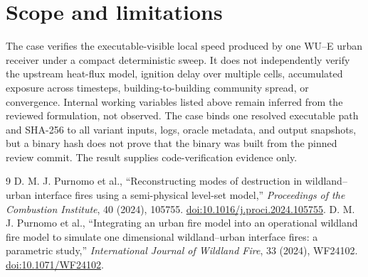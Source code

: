 \section{Scope and limitations}

The case verifies the executable-visible local speed produced by one WU--E
urban receiver under a compact deterministic sweep.  It does not independently
verify the upstream heat-flux model, ignition delay over multiple cells, accumulated exposure across
timesteps, building-to-building community spread, or convergence.  Internal
working variables listed above remain inferred from the reviewed formulation,
not observed.  The case binds one resolved executable path and SHA-256 to all
variant inputs, logs, oracle metadata, and output snapshots, but a binary hash
does not prove that the binary was built from the pinned review commit.  The
result supplies code-verification evidence only.

\begin{thebibliography}{9}
 D. M. J. Purnomo et al., ``Reconstructing modes of destruction in wildland--urban interface fires using a semi-physical level-set model,'' \emph{Proceedings of the Combustion Institute}, 40 (2024), 105755. \href{https://doi.org/10.1016/j.proci.2024.105755}{doi:10.1016/j.proci.2024.105755}.
 D. M. J. Purnomo et al., ``Integrating an urban fire model into an operational wildland fire model to simulate one dimensional wildland--urban interface fires: a parametric study,'' \emph{International Journal of Wildland Fire}, 33 (2024), WF24102. \href{https://doi.org/10.1071/WF24102}{doi:10.1071/WF24102}.
\end{thebibliography}
